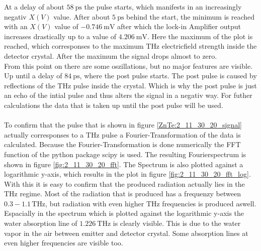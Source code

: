 At a delay of about $\SI{58}{\pico\second}$ the pulse starts, which manifests in an increasingly negativ $X(V)$ value.
After about $\SI{5}{\pico\second}$ behind the start, the minimum is reached with an $X(V)$ value of $\SI{-0.746}{\milli\V}$ after which the lock-in Amplifier output increases drastically up to a value of $\SI{4.206}{\milli\V}$.
Here the maximum of the plot is reached, which corresponses to the maximum $\si{\tera\hertz}$ electricfield strength inside the detector crystal.
After the maximum the signal drops almost to zero.
\\
From this point on there are some oszillations, but no major features are visible. %
Up until a delay of $\SI{84}{\pico\second}$, where the post pulse starts.
The post pulse is caused by reflections of the $\si{\tera\hertz}$ pulse inside the crystal.
Which is why the post pulse is just an echo of the intial pulse and thus alters the signal in a negativ way.
For futher calculations the data that is taken up until the post pulse will be used.
\\\\
\FloatBarrier
To confirm that the pulse that is shown in figure \ref{ZnTe:2_11_30_20_signal} actually corresponses to a $\si{\tera\hertz}$ pulse a Fourier-Transformation of the data is calculated. %
Because the Fourier-Transformation is done numerically the FFT function of the python package scipy \cite{scipy} is used.
The resulting Fourierspectrum is shown in figure \ref{fig:2_11_30_20_fft}.
The Spectrum is also plotted against a logarithmic y-axis, which results in the plot in figure \ref{fig:2_11_30_20_fft_log}.
\\
With this it is easy to confirm that the produced radiation actually lies in the $\si{\tera\hertz}$ regime.
Most of the radiation that is produced has a frequenzy between $0.3-1.1\,\si{\tera\hertz}$, but radiation with even higher $\si{\tera\hertz}$ frequencies is produced aswell.
Espacially in the spectrum which is plotted against the logarithmic y-axis the water absorption line of $\SI{1.226}{\tera\hertz}$ is clearly visible.
This is due to the water vapor in the air between emitter and detector crystal.
Some absorption lines at even higher frequencies are visible too.
